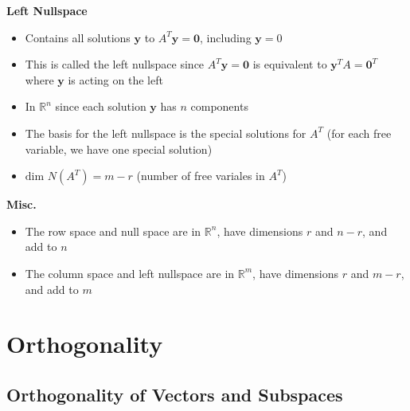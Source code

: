 \documentclass[11pt]{article}
\begin{document}
\textbf{Left Nullspace}
\begin{itemize}
    \item Contains all solutions $\boldsymbol{y}$ to $A^T\boldsymbol{y} = \boldsymbol{0}$, 
    including $\boldsymbol{y} = 0$
    \item This is called the left nullspace since $A^T\boldsymbol{y} = \boldsymbol{0}$ is 
    equivalent to  $\boldsymbol{y}^T A= \boldsymbol{0}^T$ where $\boldsymbol{y}$ is acting on
    the left
    \item In $\mathbb{R}^n$ since each solution $\boldsymbol{y}$ has $n$ components
    \item The basis for the left nullspace is the special solutions for $A^T$ (for each free 
    variable, we have one special solution)
    \item $\text{dim }N(A^T)=m-r$ (number of free variales in $A^T$)
\end{itemize}

\textbf{Misc.}
\begin{itemize}
    \item The row space and null space are in $\mathbb{R}^n$, have dimensions $r$ and $n-r$, 
    and add to $n$
    \item The column space and left nullspace are in $\mathbb{R}^m$, have dimensions $r$ and 
    $m-r$, and add to $m$
\end{itemize}

\section{Orthogonality}
\subsection{Orthogonality of Vectors and Subspaces}
\end{document}
